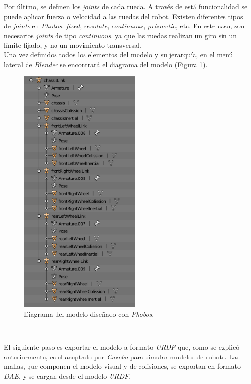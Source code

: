 Por último, se definen los \textit{joints} de cada rueda. A través de está funcionalidad se puede aplicar fuerza o velocidad a las ruedas del robot. Existen diferentes tipos de
\textit{joints} en \textit{Phobos}: \textit{fixed}, \textit{revolute}, \textit{continuous}, \textit{prismatic}, etc. En este caso, son necesarios \textit{joints} de tipo \textit{continuous}, ya que las ruedas realizan un giro sin un límite fijado, y no un movimiento transversal.\\

Una vez definidos todos los elementos del modelo y su jerarquía, en el menú lateral de \textit{Blender} se encontrará el diagrama del modelo (Figura \ref{fig:blenderdiagram}).\\
\begin{figure} [h!]
	\begin{center}
		\includegraphics[width=6cm]{figs/phobosDiagram}
	\end{center}
	\caption{Diagrama del modelo diseñado con \textit{Phobos}.}
	\label{fig:blenderdiagram}
\end{figure}\

El siguiente paso es exportar el modelo a formato \textit{URDF} que, como se explicó anteriormente, es el aceptado por \textit{Gazebo} para simular modelos de robots. Las mallas, que componen el modelo visual y de colisiones, se exportan en formato \textit{DAE}, y se cargan desde el modelo \textit{URDF}.\\

